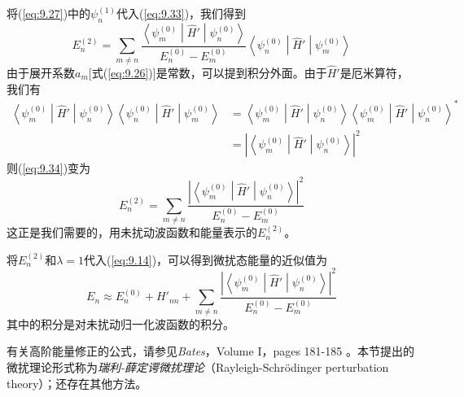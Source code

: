     将(\ref{eq:9.27})中的$\psi_n^{\left(1\right)}$代入(\ref{eq:9.33})，我们得到
    \begin{equation}
        E_n^{\left(2\right)} = \sum_{m \neq n} \frac{\left\langle \psi_m^{\left(0\right)} \middle| \hat{H}' \middle| \psi_n^{\left(0\right)} \right\rangle}{E_n^{\left(0\right)} - E_m^{\left(0\right)}} \left\langle \psi_n^{\left(0\right)} \middle| \hat{H}' \middle| \psi_m^{\left(0\right)} \right\rangle
        \label{eq:9.34}
    \end{equation}
    由于展开系数$a_m$[式(\ref{eq:9.26})]是常数，可以提到积分外面。由于$\hat{H}'$是厄米算符，我们有
    \begin{equation*}
        \begin{aligned}
            \left\langle \psi_m^{\left(0\right)} \middle| \hat{H}' \middle| \psi_n^{\left(0\right)} \right\rangle \left\langle \psi_n^{\left(0\right)} \middle| \hat{H}' \middle| \psi_m^{\left(0\right)} \right\rangle &= \left\langle \psi_m^{\left(0\right)} \middle| \hat{H}' \middle| \psi_n^{\left(0\right)} \right\rangle \left\langle \psi_m^{\left(0\right)} \middle| \hat{H}' \middle| \psi_n^{\left(0\right)} \right\rangle^{\ast} \\
            &= \left|\left\langle \psi_m^{\left(0\right)} \middle| \hat{H}' \middle| \psi_n^{\left(0\right)} \right\rangle\right|^2
        \end{aligned}
    \end{equation*}
    则(\ref{eq:9.34})变为
    \begin{equation}
        E_n^{\left(2\right)} = \sum_{m \neq n} \frac{\left|\left\langle \psi_m^{\left(0\right)} \middle| \hat{H}' \middle| \psi_n^{\left(0\right)} \right\rangle\right|^2}{E_n^{\left(0\right)} - E_m^{\left(0\right)}}
        \label{eq:9.35}
    \end{equation}
    这正是我们需要的，用未扰动波函数和能量表示的$E_n^{\left(2\right)}$。

    将$E_n^{\left(2\right)}$和$\lambda=1$代入(\ref{eq:9.14})，可以得到微扰态能量的近似值为
    \begin{equation}
        E_n \approx E_n^{\left(0\right)} + H'_{nn} + \sum_{m \neq n} \frac{\left|\left\langle \psi_m^{\left(0\right)} \middle| \hat{H}' \middle| \psi_n^{\left(0\right)} \right\rangle\right|^2}{E_n^{\left(0\right)} - E_m^{\left(0\right)}}
        \label{eq:9.36}
    \end{equation}
    其中的积分是对未扰动归一化波函数的积分。

    有关高阶能量修正的公式，请参见\textit{Bates}，Volume I，pages 181-185 。本节提出的微扰理论形式称为\textit{瑞利-薛定谔微扰理论}（Rayleigh-Schrödinger perturbation theory）；还存在其他方法。

